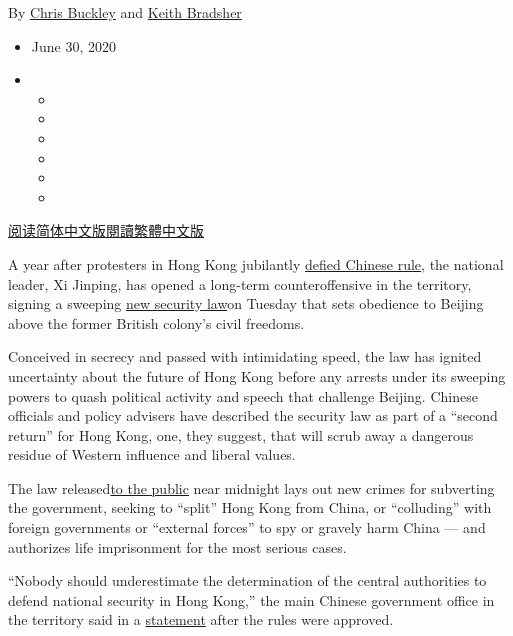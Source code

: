 By \href{https://www.nytimes.com/by/chris-buckley}{Chris Buckley} and
\href{https://www.nytimes.com/by/keith-bradsher}{Keith Bradsher}

\begin{itemize}
\item
  June 30, 2020
\item
  \begin{itemize}
  \item
  \item
  \item
  \item
  \item
  \item
  \end{itemize}
\end{itemize}

\href{https://cn.nytimes.com/china/20200701/china-critics-security-law-hong-kong/}{阅读简体中文版}\href{https://cn.nytimes.com/china/20200701/china-critics-security-law-hong-kong/zh-ha}{閱讀繁體中文版}

A year after protesters in Hong Kong jubilantly
\href{https://www.nytimes.com/2019/07/01/world/asia/china-hong-kong-protest.html}{defied
Chinese rule}, the national leader, Xi Jinping, has opened a long-term
counteroffensive in the territory, signing a sweeping
\href{https://www.nytimes.com/2020/06/29/world/asia/china-hong-kong-security-law-rules.html}{new
security law}on Tuesday that sets obedience to Beijing above the former
British colony's civil freedoms.

Conceived in secrecy and passed with intimidating speed, the law has
ignited uncertainty about the future of Hong Kong before any arrests
under its sweeping powers to quash political activity and speech that
challenge Beijing. Chinese officials and policy advisers have described
the security law as part of a ``second return'' for Hong Kong, one, they
suggest, that will scrub away a dangerous residue of Western influence
and liberal values.

The law
released\href{https://www.gld.gov.hk/egazette/pdf/20202444e/es220202444136.pdf}{to
the public} near midnight lays out new crimes for subverting the
government, seeking to ``split'' Hong Kong from China, or ``colluding''
with foreign governments or ``external forces'' to spy or gravely harm
China --- and authorizes life imprisonment for the most serious cases.

``Nobody should underestimate the determination of the central
authorities to defend national security in Hong Kong,'' the main Chinese
government office in the territory said in a
\href{http://hm.people.com.cn/n1/2020/0630/c42272-31765400.html}{statement}
after the rules were approved.

